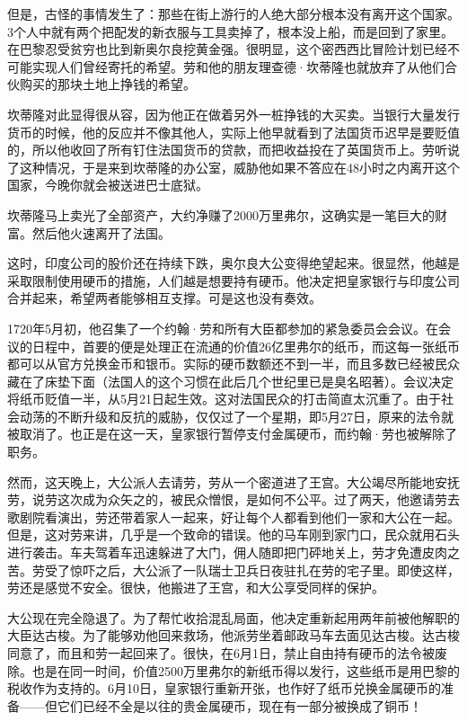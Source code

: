 \documentclass[12pt,oneside]{book}
\begin{document}
\begin{mdframed}
但是，古怪的事情发生了：那些在街上游行的人绝大部分根本没有离开这个国家。3个人中就有两个把配发的新衣服与工具卖掉了，根本没上船，而是回到了家里。在巴黎忍受贫穷也比到新奥尔良挖黄金强。很明显，这个密西西比冒险计划已经不可能实现人们曾经寄托的希望。劳和他的朋友理查德·坎蒂隆也就放弃了从他们合伙购买的那块土地上挣钱的希望。

坎蒂隆对此显得很从容，因为他正在做着另外一桩挣钱的大买卖。当银行大量发行货币的时候，他的反应并不像其他人，实际上他早就看到了法国货币迟早是要贬值的，所以他收回了所有钉住法国货币的贷款，而把收益投在了英国货币上。劳听说了这种情况，于是来到坎蒂隆的办公室，威胁他如果不答应在48小时之内离开这个国家，今晚你就会被送进巴士底狱。

坎蒂隆马上卖光了全部资产，大约净赚了2000万里弗尔，这确实是一笔巨大的财富。然后他火速离开了法国。

这时，印度公司的股价还在持续下跌，奥尔良大公变得绝望起来。很显然，他越是采取限制使用硬币的措施，人们越是想要持有硬币。他决定把皇家银行与印度公司合并起来，希望两者能够相互支撑。可是这也没有奏效。

1720年5月初，他召集了一个约翰·劳和所有大臣都参加的紧急委员会会议。在会议的日程中，首要的便是处理正在流通的价值26亿里弗尔的纸币，而这每一张纸币都可以从官方兑换金币和银币。实际的硬币数额还不到一半，而且多数已经被民众藏在了床垫下面（法国人的这个习惯在此后几个世纪里已是臭名昭著）。会议决定将纸币贬值一半，从5月21日起生效。这对法国民众的打击简直太沉重了。由于社会动荡的不断升级和反抗的威胁，仅仅过了一个星期，即5月27日，原来的法令就被取消了。也正是在这一天，皇家银行暂停支付金属硬币，而约翰·劳也被解除了职务。

然而，这天晚上，大公派人去请劳，劳从一个密道进了王宫。大公竭尽所能地安抚劳，说劳这次成为众矢之的，被民众憎恨，是如何不公平。过了两天，他邀请劳去歌剧院看演出，劳还带着家人一起来，好让每个人都看到他们一家和大公在一起。但是，这对劳来讲，几乎是一个致命的错误。他的马车刚到家门口，民众就用石头进行袭击。车夫驾着车迅速躲进了大门，佣人随即把门砰地关上，劳才免遭皮肉之苦。劳受了惊吓之后，大公派了一队瑞士卫兵日夜驻扎在劳的宅子里。即使这样，劳还是感觉不安全。很快，他搬进了王宫，和大公享受同样的保护。

大公现在完全隐退了。为了帮忙收拾混乱局面，他决定重新起用两年前被他解职的大臣达古梭。为了能够劝他回来救场，他派劳坐着邮政马车去面见达古梭。达古梭同意了，而且和劳一起回来了。很快，在6月1日，禁止自由持有硬币的法令被废除。也是在同一时间，价值2500万里弗尔的新纸币得以发行，这些纸币是用巴黎的税收作为支持的。6月10日，皇家银行重新开张，也作好了纸币兑换金属硬币的准备——但它们已经不全是以往的贵金属硬币，现在有一部分被换成了铜币！


\end{mdframed}
\end{document}
